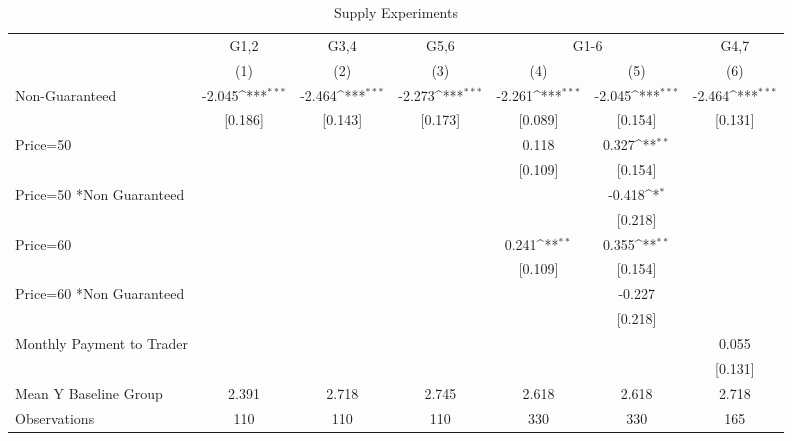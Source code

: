 {
\def\sym#1{\ifmmode^{#1}\else\(^{#1}\)\fi}
\begin{longtable}{l*{6}{c}}
\caption{Supply Experiments \label{tab:lif}}\\
\hline\hline\endfirsthead\hline\endhead\hline\endfoot\endlastfoot
                &\multicolumn{1}{c}{G1,2}&\multicolumn{1}{c}{G3,4}&\multicolumn{1}{c}{G5,6}&\multicolumn{2}{c}{G1-6}             &\multicolumn{1}{c}{G4,7}\\\cmidrule(lr){2-2}\cmidrule(lr){3-3}\cmidrule(lr){4-4}\cmidrule(lr){5-6}\cmidrule(lr){7-7}
                &\multicolumn{1}{c}{(1)}         &\multicolumn{1}{c}{(2)}         &\multicolumn{1}{c}{(3)}         &\multicolumn{1}{c}{(4)}         &\multicolumn{1}{c}{(5)}         &\multicolumn{1}{c}{(6)}         \\
\hline
Non-Guaranteed  &   -2.045\sym{***}&   -2.464\sym{***}&   -2.273\sym{***}&   -2.261\sym{***}&   -2.045\sym{***}&   -2.464\sym{***}\\
                &  [0.186]         &  [0.143]         &  [0.173]         &  [0.089]         &  [0.154]         &  [0.131]         \\
Price=50        &                  &                  &                  &    0.118         &    0.327\sym{**} &                  \\
                &                  &                  &                  &  [0.109]         &  [0.154]         &                  \\
Price=50 *Non Guaranteed&                  &                  &                  &                  &   -0.418\sym{*}  &                  \\
                &                  &                  &                  &                  &  [0.218]         &                  \\
Price=60        &                  &                  &                  &    0.241\sym{**} &    0.355\sym{**} &                  \\
                &                  &                  &                  &  [0.109]         &  [0.154]         &                  \\
Price=60 *Non Guaranteed&                  &                  &                  &                  &   -0.227         &                  \\
                &                  &                  &                  &                  &  [0.218]         &                  \\
Monthly Payment to Trader&                  &                  &                  &                  &                  &    0.055         \\
                &                  &                  &                  &                  &                  &  [0.131]         \\
\hline
Mean Y Baseline Group&    2.391         &    2.718         &    2.745         &    2.618         &    2.618         &    2.718         \\
Observations    &      110         &      110         &      110         &      330         &      330         &      165         \\
\hline\hline
\end{longtable}
}
